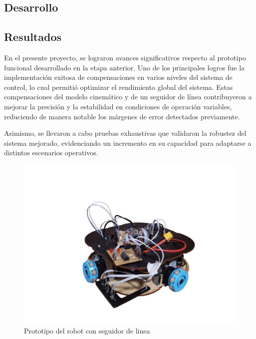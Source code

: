 \subsection{Desarrollo}







\subsection{Resultados}

En el presente proyecto, se lograron avances significativos respecto al prototipo funcional desarrollado en la etapa anterior. Uno de los principales logros fue la implementación exitosa de compensaciones en varios niveles del sistema de control, lo cual permitió optimizar el rendimiento global del sistema. Estas compensaciones del modelo cinemático y de un seguidor de línea contribuyeron a mejorar la precisión y la estabilidad en condiciones de operación variables, reduciendo de manera notable los márgenes de error detectados previamente.

Asimismo, se llevaron a cabo pruebas exhaustivas que validaron la robustez del sistema mejorado, evidenciando un incremento en su capacidad para adaptarse a distintos escenarios operativos.

\begin{figure}[H]
    \centering
    \includegraphics[trim={0 2cm 0 7.5cm}, clip, width=1\linewidth]{images/prototipo_robot_con_sens_mag.png}
    \caption{Prototipo del robot con seguidor de linea}
    \label{fig:prototiporobotlinef}
\end{figure}

